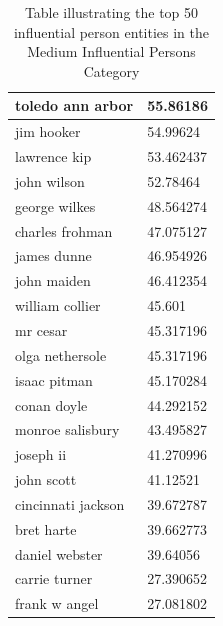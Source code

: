 \documentclass[letterpaper,11pt]{report}
\begin{document}
\begin{table}[h]
\begin{tabular}{|l|l|}
toledo ann arbor   & 55.86186   \\ \hline
jim hooker         & 54.99624   \\ \hline
lawrence kip       & 53.462437  \\ \hline
john wilson        & 52.78464   \\ \hline
george wilkes      & 48.564274  \\ \hline
charles frohman    & 47.075127  \\ \hline
james dunne        & 46.954926  \\ \hline
john maiden        & 46.412354  \\ \hline
william collier    & 45.601     \\ \hline
mr cesar           & 45.317196  \\ \hline
olga nethersole    & 45.317196  \\ \hline
isaac pitman       & 45.170284  \\ \hline
conan doyle        & 44.292152  \\ \hline
monroe salisbury   & 43.495827  \\ \hline
joseph ii          & 41.270996  \\ \hline
john scott         & 41.12521   \\ \hline
cincinnati jackson & 39.672787  \\ \hline
bret harte         & 39.662773  \\ \hline
daniel webster     & 39.64056   \\ \hline
carrie turner      & 27.390652  \\ \hline
frank w angel      & 27.081802  \\ \hline
\end{tabular}
\caption{Table illustrating the top 50 influential person entities in the Medium Influential Persons Category}
\label{table:app2}
\end{table}
\end{document}
